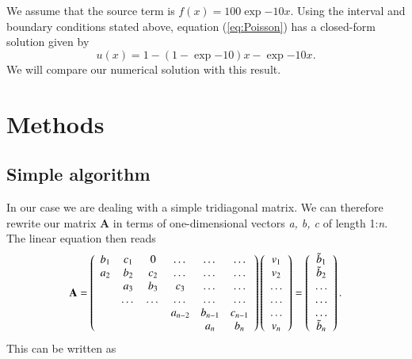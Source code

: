 \documentclass{article}
\begin{document}
\begin{multicols}{2}
We assume that the source term is $f(x) = 100\exp{-10x}$. Using the interval and boundary conditions stated above, equation (\ref{eq:Poisson}) has a closed-form solution given by
\begin{equation}
u(x) = 1-(1-\exp{-10})x-\exp{-10x}.
\end{equation}
We will compare our numerical solution with this result. 





\section{Methods}
\subsection{Simple algorithm}
In our case we are dealing with a simple tridiagonal matrix. We can therefore rewrite our matrix \textbf{A} in terms of one-dimensional vectors \textit{a, b, c} of length 1:\textit{n}. The linear equation then reads
\begin{equation}
    {\bf A} = \left(\begin{array}{cccccc}
                           b_1& c_1 & 0 &\dots   & \dots &\dots \\
                           a_2 & b_2 & c_2 &\dots &\dots &\dots \\
                           & a_3 & b_3 & c_3 & \dots & \dots \\
                           & \dots   & \dots &\dots   &\dots & \dots \\
                           &   &  &a_{n-2}  &b_{n-1}& c_{n-1} \\
                           &    &  &   &a_n & b_n \\
                      \end{array} \right)\left(\begin{array}{c}
                           v_1\\
                           v_2\\
                           \dots \\
                          \dots  \\
                          \dots \\
                           v_n\\
                      \end{array} \right)
  =\left(\begin{array}{c}
                           \tilde{b}_1\\
                           \tilde{b}_2\\
                           \dots \\
                           \dots \\
                          \dots \\
                           \tilde{b}_n\\
                      \end{array} \right).
\end{equation}
This can be written as


\end{multicols}
\end{document}

